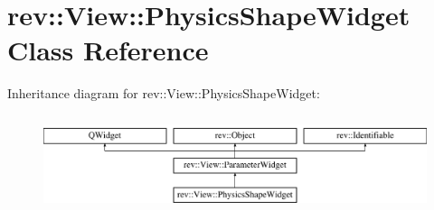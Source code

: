 \hypertarget{classrev_1_1_view_1_1_physics_shape_widget}{}\section{rev\+::View\+::Physics\+Shape\+Widget Class Reference}
\label{classrev_1_1_view_1_1_physics_shape_widget}
Inheritance diagram for rev\+::View\+::Physics\+Shape\+Widget\+:\begin{figure}[H]
\begin{center}
\leavevmode
\includegraphics[height=2.842640cm]{classrev_1_1_view_1_1_physics_shape_widget}
\end{center}
\end{figure}
